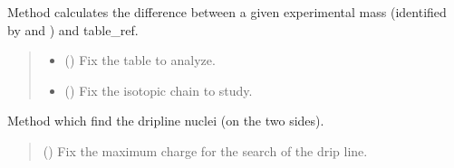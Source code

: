 \documentclass[letterpaper,10pt,english]{sphinxmanual}
\begin{document}
\begin{fulllineitems}
\begin{fulllineitems}
\label{\detokenize{source/api/setup_masses_theory:nucleardatapy.setup_masses_theory.SetupMassesTheory.diff_exp}}
\pysigstartsignatures
\pysiglinewithargsret
{}
{\sphinxparamcomma {}\sphinxparamcomma {}}
{}
\pysigstopsignatures
\sphinxAtStartPar
Method calculates the difference between a given experimental
mass (identified by  and ) and table\_ref.
\begin{quote}\begin{description}
\begin{itemize}
\item {} 
\sphinxAtStartPar
{} () \textendash{} Fix the table to analyze.

\item {} 
\sphinxAtStartPar
{} (\sphinxstyleliteralemphasis{\sphinxupquote{, }}) \textendash{} Fix the isotopic chain to study.

\end{itemize}

\end{description}\end{quote}

\sphinxAtStartPar
{}

\end{fulllineitems}


\begin{fulllineitems}
\label{\detokenize{source/api/setup_masses_theory:nucleardatapy.setup_masses_theory.SetupMassesTheory.drip}}
\pysigstartsignatures
\pysiglinewithargsret
{}
{}
{}
\pysigstopsignatures
\sphinxAtStartPar
Method which find the drip\sphinxhyphen{}line nuclei (on the two sides).
\begin{quote}\begin{description}
\sphinxAtStartPar
{} (\sphinxstyleliteralemphasis{\sphinxupquote{, }}) \textendash{} Fix the maximum charge for the search of the drip line.


\end{description}
\end{quote}
\end{fulllineitems}
\end{fulllineitems}
\end{document}
